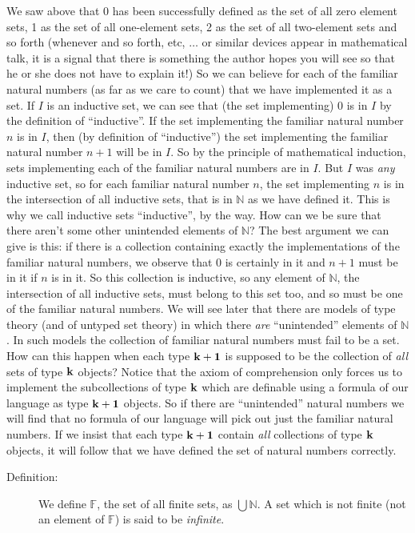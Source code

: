 \documentclass[12pt]{book}
\begin{document}
We saw above that 0 has been successfully defined as the set of all
zero element sets, 1 as the set of all one-element sets, 2 as the set
of all two-element sets and so forth (whenever and so forth, etc,
$\ldots$ or similar devices appear in mathematical talk, it is a
signal that there is something the author hopes you will see so that
he or she does not have to explain it!)  So we can believe for each of
the familiar natural numbers (as far as we care to count) that we have
implemented it as a set.  If $I$ is an inductive set, we can see that
(the set implementing) 0 is in $I$ by the definition of ``inductive''.
If the set implementing the familiar natural number $n$ is in $I$,
then (by definition of ``inductive'') the set implementing the
familiar natural number $n+1$ will be in $I$.  So by the principle of
mathematical induction, sets implementing each of the familiar natural
numbers are in $I$.  But $I$ was {\em any\/} inductive set, so for
each familiar natural number $n$, the set implementing $n$ is in the
intersection of all inductive sets, that is in $\mathbb N$ as we have
defined it.  This is why we call inductive sets ``inductive'', by the
way.  How can we be sure that there aren't some other unintended
elements of ${\mathbb N}$?  The best argument we can give is this: if
there is a collection containing exactly the implementations of the
familiar natural numbers, we observe that 0 is certainly in it and
$n+1$ must be in it if $n$ is in it.  So this collection is inductive,
so any element of ${\mathbb N}$, the intersection of all inductive
sets, must belong to this set too, and so must be one of the familiar
natural numbers.  We will see later that there are models of type
theory (and of untyped set theory) in which there {\em are\/}
``unintended'' elements of ${\mathbb N}$.  In such models the
collection of familiar natural numbers must fail to be a set.  How can
this happen when each type ${\bf k+1}$ is supposed to be the collection of {\em
all\/} sets of type ${\bf k}$ objects?  Notice that the axiom of comprehension
only forces us to implement the subcollections of type $\bf k$ which are
definable using a formula of our language as type $\bf k+1$ objects.  So
if there are ``unintended'' natural numbers we will find that no
formula of our language will pick out just the familiar natural
numbers.  If we insist that each type $\bf k+1$ contain {\em all\/}
collections of type $\bf k$ objects, it will follow that we have defined the
set of natural numbers correctly.

\begin{description}

\item[Definition:] We define ${\mathbb F}$, the set of all finite
sets, as $\bigcup {\mathbb N}$.  A set which is not finite (not an
element of ${\mathbb F}$) is said to be {\em infinite\/}.

\end{description}
\end{document}
